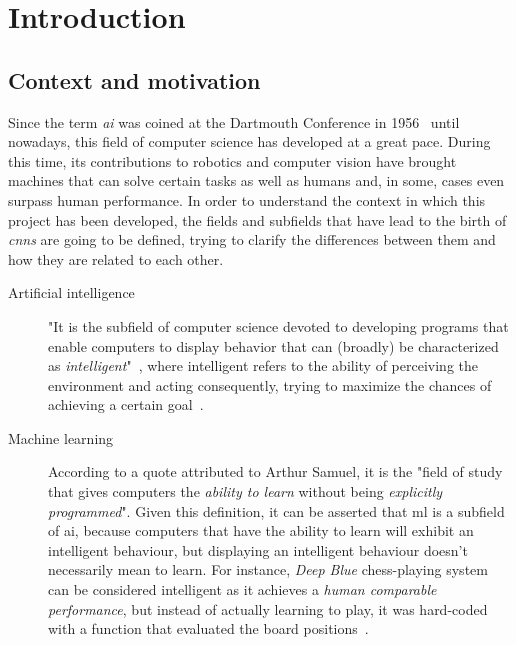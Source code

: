 \chapter{Introduction}\label{ch:introduction}
\section{Context and motivation}
Since the term \emph{\gls{ai}} was coined at the Dartmouth Conference in 1956~\cite{mccarthy2006proposal} until nowadays, this field of computer science has developed at a great pace. During this time, its contributions to robotics and computer vision have brought machines that can solve certain tasks as well as humans and, in some, cases even surpass human performance. In order to understand the context in which this project has been developed, the fields and subfields that have lead to the birth of \emph{\glspl{cnn}} are going to be defined, trying to clarify the differences between them and how they are related to each other. 
\begin{description}
	\item[Artificial intelligence] "It is the subfield of computer science devoted to developing programs that enable computers to display behavior that can (broadly) be characterized as \emph{intelligent}"~\cite{sep-logic-ai}, where intelligent refers to the ability of perceiving the environment and acting consequently, trying to maximize the chances of achieving a certain goal~\cite{Russell:2003:AIM:773294}.
\end{description}
\begin{description}
	\item[Machine learning] According to a quote attributed to Arthur Samuel, it is the "field of study that gives computers the \emph{ability to learn} without being \emph{explicitly programmed}". Given this definition, it can be asserted that \gls{ml} is a subfield of \gls{ai}, because computers that have the ability to learn will exhibit an intelligent behaviour, but displaying an intelligent behaviour doesn't necessarily mean to learn. For instance, \emph{Deep Blue} chess-playing system can be considered intelligent as it achieves a \emph{human comparable performance}, but instead of actually learning to play, it was hard-coded with a function that evaluated the board positions~\cite{Goodfellow-et-al-2016}.  
\end{description}
